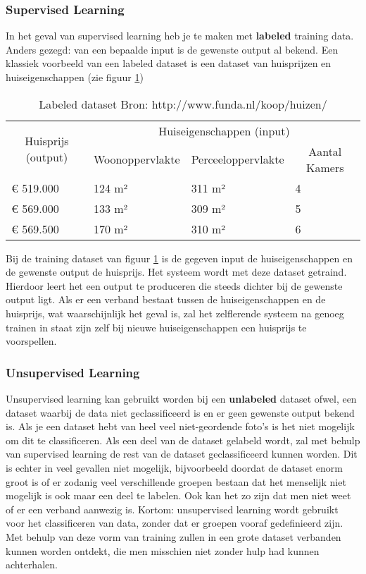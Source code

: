 \subsubsection{Supervised Learning}
In het geval van supervised learning heb je te maken met \textbf{labeled} training data. Anders gezegd: van een bepaalde input is de gewenste output al bekend. Een klassiek voorbeeld van een labeled dataset is een dataset van huisprijzen en huiseigenschappen (zie figuur \ref{fig:LabeledDataset})

\begin{table}[h]
\centering
\begin{tabular}{llll}
\hline
\multicolumn{1}{c}{\multirow{2}{*}{Huisprijs (output)}} & \multicolumn{3}{c}{Huiseigenschappen (input)} \\
\multicolumn{1}{c}{} & \multicolumn{1}{c}{Woonoppervlakte} & \multicolumn{1}{c}{Perceeloppervlakte} & \multicolumn{1}{c}{Aantal Kamers} \\ \hline
€ 519.000 & 124 m² & 311 m² & 4 \\
€ 569.000 & 133 m² & 309 m² & 5 \\
€ 569.500 & 170 m² & 310 m² & 6 \\ \hline
\end{tabular}
\caption{Labeled dataset Bron: http://www.funda.nl/koop/huizen/ }
\label{fig:LabeledDataset}
\end{table}
Bij de training dataset van figuur \ref{fig:LabeledDataset} is de gegeven input de huiseigenschappen en de gewenste output de huisprijs. Het systeem wordt met deze dataset getraind. Hierdoor leert het een output te produceren die steeds dichter bij de gewenste output ligt. Als er een verband bestaat tussen de huiseigenschappen en de huisprijs, wat waarschijnlijk het geval is, zal het zelflerende systeem na genoeg trainen in staat zijn zelf bij nieuwe huiseigenschappen een huisprijs te voorspellen. \cite{MLCourse1}

\subsubsection{Unsupervised Learning}
Unsupervised learning kan gebruikt worden bij een \textbf{unlabeled} dataset ofwel, een dataset waarbij de data niet geclassificeerd is en er geen gewenste output bekend is. Als je een dataset hebt van heel veel niet-geordende foto's is het niet mogelijk om dit te classificeren. Als een deel van de dataset gelabeld wordt, zal met behulp van supervised learning de rest van de dataset geclassificeerd kunnen worden. Dit is echter in veel gevallen niet mogelijk, bijvoorbeeld doordat de dataset enorm groot is of er zodanig veel verschillende groepen bestaan dat het menselijk niet mogelijk is ook maar een deel te labelen. Ook kan het zo zijn dat men niet weet of er een verband aanwezig is. 
Kortom: unsupervised learning wordt gebruikt voor het classificeren van data, zonder dat er groepen vooraf gedefinieerd zijn. Met behulp van deze vorm van training zullen in een grote dataset verbanden kunnen worden ontdekt, die men misschien niet zonder hulp had kunnen achterhalen.\cite{MLCourse2}

